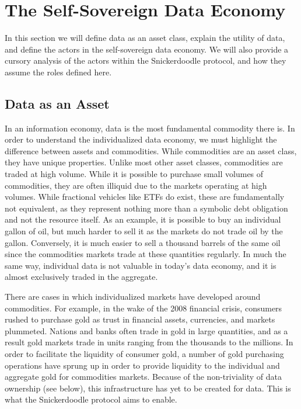 \section{The Self-Sovereign Data Economy}  %


In this section we will define data as an asset class, explain the utility of data, and define the actors in the self-sovereign data economy. We will also provide a cursory analysis of the actors within the Snickerdoodle protocol, and how they assume the roles defined here.

\subsection{Data as an Asset}
In an information economy, data is the most fundamental commodity there is. In order to understand the individualized data economy, we must highlight the difference between assets and commodities. While commodities are an asset class, they have unique properties. Unlike most other asset classes, commodities are traded at high volume. While it is possible to purchase small volumes of commodities, they are often illiquid due to the markets operating at high volumes. While fractional vehicles like ETFs do exist, these are fundamentally not equivalent, as they represent nothing more than a symbolic debt obligation and not the resource itself. As an example, it is possible to buy an individual gallon of oil, but much harder to sell it as the markets do not trade oil by the gallon. Conversely, it is much easier to sell a thousand barrels of the same oil since the commodities markets trade at these quantities regularly. In much the same way, individual data is not valuable in today's data economy, and it is almost exclusively traded in the aggregate.

There are cases in which individualized markets have developed around commodities. For example, in the wake of the 2008 financial crisis, consumers rushed to purchase gold as trust in financial assets, currencies, and markets plummeted. Nations and banks often trade in gold in large quantities, and as a result gold markets trade in units ranging from the thousands to the millions. In order to facilitate the liquidity of consumer gold, a number of gold purchasing operations have sprung up in order to provide liquidity to the individual and aggregate gold for commodities markets. Because of the non-triviality of data ownership (see below), this infrastructure has yet to be created for data. This is what the Snickerdoodle protocol aims to enable.


